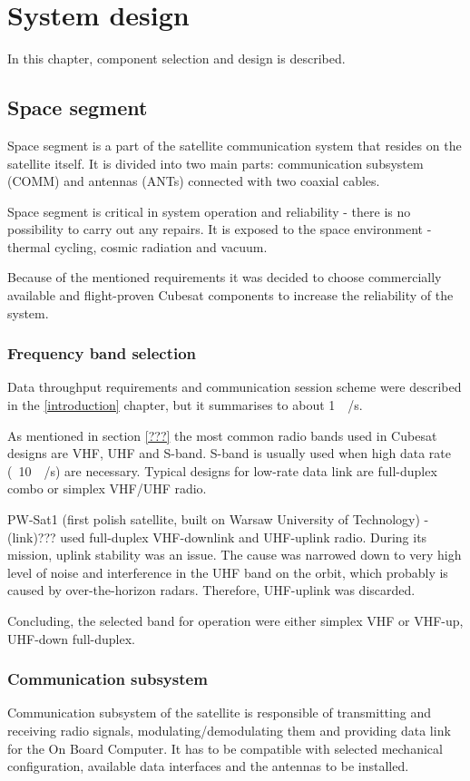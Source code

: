 \chapter{System design}

In this chapter, component selection and design is described. 

\section{Space segment}
Space segment is a part of the satellite communication system that resides on the satellite itself. It is divided into two main parts: communication subsystem (COMM) and antennas (ANTs) connected with two coaxial cables.

Space segment is critical in system operation and reliability - there is no possibility to carry out any repairs. It is exposed to the space environment - thermal cycling, cosmic radiation and vacuum.

Because of the mentioned requirements it was decided to choose commercially available and flight-proven Cubesat components to increase the reliability of the system.

\subsection{Frequency band selection}
Data throughput requirements and communication session scheme were described in the \ref{introduction} chapter, but it summarises to about \SI{1}{\kilo\byte / \second}.

As mentioned in section \ref{???} the most common radio bands used in Cubesat designs are VHF, UHF and S-band. S-band is usually used when high data rate (~\SI{10}{\mega\bits / \second}) are necessary. Typical designs for low-rate data link are full-duplex combo or simplex VHF/UHF radio.

PW-Sat1 (first polish satellite, built on Warsaw University of Technology) - (link)??? used full-duplex VHF-downlink and UHF-uplink radio. During its mission, uplink stability was an issue. The cause was narrowed down to very high level of noise and interference in the UHF band on the orbit, which probably is caused by over-the-horizon radars. Therefore, UHF-uplink was discarded.

Concluding, the selected band for operation were either simplex VHF or VHF-up, UHF-down full-duplex.

\subsection{Communication subsystem}
Communication subsystem of the satellite is responsible of transmitting and receiving radio signals, modulating/demodulating them and providing data link for the On Board Computer. It has to be compatible with selected mechanical configuration, available data interfaces and the antennas to be installed.

